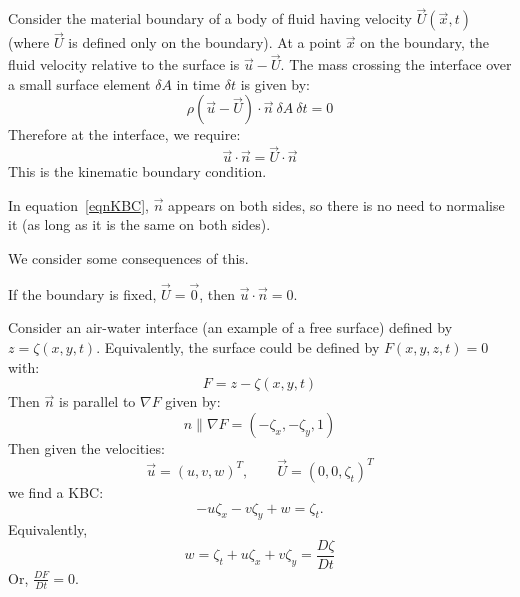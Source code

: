 \documentclass[../Main.tex]{subfiles}
\begin{document}
Consider the material boundary of a body of fluid having velocity $\vec{U}(\vec{x}, t)$ (where $\vec{U}$ is defined only on the boundary). At a point $\vec{x}$ on the boundary, the fluid velocity relative to the surface is $\vec{u} - \vec{U}$. The mass crossing the interface over a small surface element $\delta A$ in time $\delta t$ is given by:
\begin{equation*}
    \rho (\vec{u} - \vec{U}) \cdot \vec{n}~\delta A~\delta t = 0
\end{equation*}
Therefore at the interface, we require:
\begin{equation}
    \vec{u} \cdot \vec{n} = \vec{U} \cdot \vec{n}
    \label{eqnKBC}
\end{equation}
This is the kinematic boundary condition.
\begin{remark}
    In equation~\ref{eqnKBC}, $\vec{n}$ appears on both sides, so there is no need to normalise it (as long as it is the same on both sides).
\end{remark}
\begin{examples}{We consider some consequences of this.}
    \item If the boundary is fixed, $\vec{U} = \vec{0}$, then $\vec{u} \cdot \vec{n} = 0$.
    \item Consider an air-water interface (an example of a free surface) defined by $z = \zeta(x, y, t)$. Equivalently, the surface could be defined by $F(x, y, z, t) = 0$ with:
        \begin{equation*}
            F = z - \zeta(x, y, t)
        \end{equation*}
        Then $\vec{n}$ is parallel to $\nabla F$ given by:
        \begin{equation*}
            n \parallel \nabla F = (-\zeta_x, -\zeta_y, 1)
        \end{equation*}
        Then given the velocities:
        \begin{equation*}
            \vec{u} = (u, v, w)^T,\qquad \vec{U} = (0, 0, \zeta_t)^T
        \end{equation*}
        we find a KBC:
        \begin{equation*}
            -u \zeta_x - v\zeta_y + w = \zeta_t.
        \end{equation*}
        Equivalently,
        \begin{equation*}
            w = \zeta_t + u \zeta_x + v \zeta_y = \frac{D \zeta}{D t}
        \end{equation*}
        Or, $\frac{D F}{D t} = 0$.
\end{examples}
\end{document}
